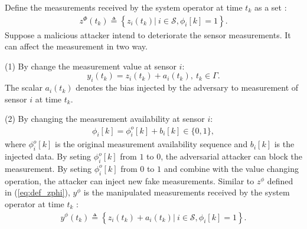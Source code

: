\documentclass[12pt]{article}
\newcommand{\Ss}{{\mathscr{S}}}
\newcommand{\ift}{{\infty}}
\newcommand{\gm}{{\Gamma}}
\begin{document}
Define the measurements received by the system operator at time $t_k$ as a set :
\begin{align}\label{eq:def_zphi}
{z}^\Phi(t_k)\triangleq\left\{z_i(t_k)| \ i\in\Ss, \phi_i[k]=1\right\}.
\end{align}
Suppose a malicious attacker intend to deteriorate the sensor measurements. 
It can affect the measurement in two way. 

(1) By change the measurement value at sensor $i$:
\begin{equation}\label{eq:y_def}
y_i(t_k)=z_i(t_k)+a_i(t_k), \ t_k\in\gm .
\end{equation}
The scalar $a_i(t_k)$ denotes the bias injected by the adversary to measurement of sensor $i$ at time $t_k$.

(2) By changing the measurement availability at sensor $i$:
\begin{align*}
\phi_i[k]=\phi^o_i[k]+b_i[k]\in\{0,1\}, 
\end{align*}
where $\phi^o_i[k]$ is the original measurement availability sequence and $b_i[k]$ is the injected data.
By seting $\phi^o_i[k]$ from $1$ to $0$, the adversarial attacker can block the measurement. 
By seting $\phi^o_i[k]$ from $0$ to $1$ and combine with the value changing operation, the attacker can inject new fake measurements. Similar to $z^\phi$ defined in (\ref{eq:def_zphi}), $y^\phi$ is the manipulated measurements received by the system operator at time $t_k$ :
\begin{align}\label{eq:def_ypsi}
{y}^\phi(t_k)\triangleq\left\{z_i(t_k)+a_i(t_k)| \ i\in\Ss, \phi_i[k]=1\right\}.
\end{align}
\end{document}
